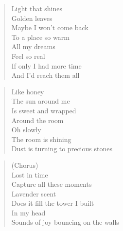 


\begin{minipage}{0.6\textwidth}
    \begin{verse}
    Light that shines \\
	Golden leaves \\
	Maybe I won't come back \\
	To a place so warm \\
	All my dreams \\
	Feel so real \\
	If only I had more time \\
	And I'd reach them all
    \end{verse}
    
    \begin{verse}
    Like honey \\
	The sun around me \\
	Is sweet and wrapped \\
	Around the room \\
	Oh slowly \\
	The room is shining \\
	Dust is turning to precious stones
    \end{verse}

    \begin{verse}
    (Chorus) \\
	Lost in time \\
	Capture all these moments \\
	Lavender scent \\
	Does it fill the tower I built \\
	In my head \\
	Sounds of joy bouncing on the walls
    \end{verse}

\end{minipage}
\clearpage

